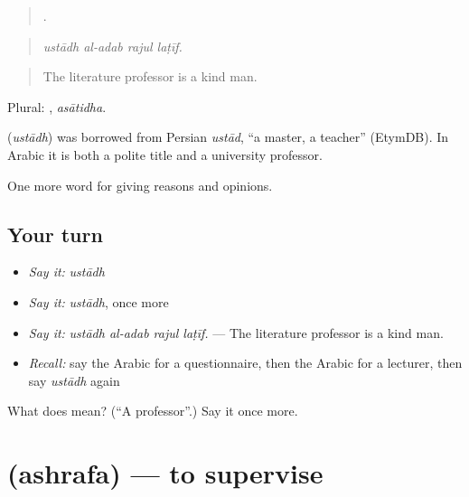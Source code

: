 \begin{quote}
   .
\end{quote}

\begin{quote}
\emph{ustādh al-adab rajul laṭīf.}
\end{quote}

\begin{quote}
The literature professor is a kind man.
\end{quote}

Plural: , \emph{asātidha}.

\begin{cousinweb}
\textbf{} (\emph{ustādh}) was borrowed from Persian \emph{ustād}, \textquotedblleft{}a master, a teacher\textquotedblright{} (EtymDB). In Arabic it is both a polite title and a university professor.
\end{cousinweb}

\begin{grammarlens}[title={What you've built}]
One more word for giving reasons and opinions.
\end{grammarlens}

\subsection*{Your turn}
\begin{itemize}
\raggedright
  \item \emph{Say it:} \emph{ustādh}
  \item \emph{Say it:} \emph{ustādh}, once more
  \item \emph{Say it:} \emph{ustādh al-adab rajul laṭīf.} — The literature professor is a kind man.
  \item \emph{Recall:} say the Arabic for a questionnaire, then the Arabic for a lecturer, then say \emph{ustādh} again
\end{itemize}

\begin{tcolorbox}[breakable,colback=teal!4,colframe=teal!35!black,title={Before you move on}]
What does  mean? (\textquotedblleft{}A professor\textquotedblright{}.) Say it once more.
\end{tcolorbox}
\section[\texorpdfstring{\ar{أشرف} (ashrafa)}{أشرف (ashrafa)}]{ (ashrafa) — to supervise}

